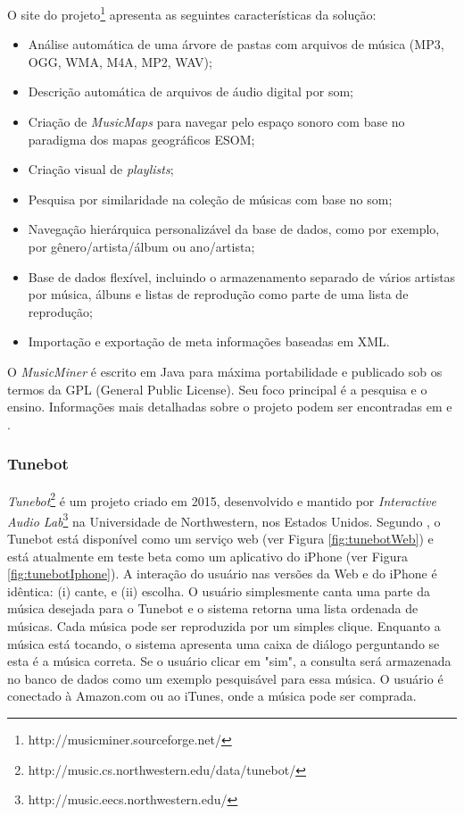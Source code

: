 O site do projeto\footnote{http://musicminer.sourceforge.net/}  apresenta as seguintes características da solução:

\begin{itemize}
    \item Análise automática de uma árvore de pastas com arquivos de música (MP3, OGG, WMA, M4A, MP2, WAV);
    \item Descrição automática de arquivos de áudio digital por som;
    \item Criação de \textit{MusicMaps} para navegar pelo espaço sonoro com base no paradigma dos mapas geográficos ESOM;
    \item Criação visual de \textit{playlists};
    \item Pesquisa por similaridade na coleção de músicas com base no som;
    \item Navegação hierárquica personalizável da base de dados, como por exemplo, por gênero/artista/álbum ou ano/artista;
    \item Base de dados flexível, incluindo o armazenamento separado de vários artistas por música, álbuns e listas de reprodução como parte de uma lista de reprodução;
    \item Importação e exportação de meta informações baseadas em XML.
\end{itemize}

O \textit{MusicMiner} é escrito em Java para máxima portabilidade e publicado sob os termos da GPL (General Public License). Seu foco principal é a pesquisa e o ensino. Informações mais detalhadas sobre o projeto podem ser encontradas em \cite{morchen2005} e \cite{musicminer}.

\subsubsection{Tunebot} \label{subsec:tunebot}
\textit{Tunebot}\footnote{http://music.cs.northwestern.edu/data/tunebot/} é um projeto criado em 2015, desenvolvido e mantido por \textit{Interactive Audio Lab}\footnote{http://music.eecs.northwestern.edu/} na Universidade de Northwestern, nos Estados Unidos. Segundo \cite{pardo2010}, o Tunebot está disponível como um serviço web (ver Figura \ref{fig:tunebotWeb}) e está atualmente em teste beta como um aplicativo do iPhone (ver Figura \ref{fig:tunebotIphone}). A interação do usuário nas versões da Web e do iPhone é idêntica:
(i) cante, e (ii) escolha. O usuário simplesmente canta uma parte da música desejada para o Tunebot e o sistema retorna uma lista ordenada de músicas. Cada música pode ser reproduzida por um simples clique. Enquanto a música está tocando, o sistema apresenta uma caixa de diálogo perguntando se esta é a música correta. Se o usuário clicar em "sim", a consulta será armazenada no banco de dados como um exemplo pesquisável para essa música. O usuário é conectado à Amazon.com ou ao iTunes, onde a música pode ser comprada.

